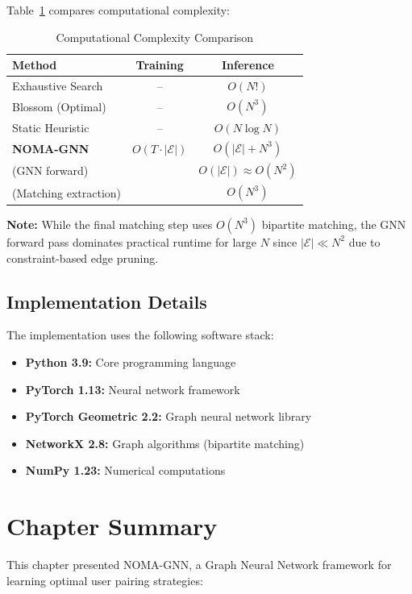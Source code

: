 Table~\ref{tab:complexity} compares computational complexity:

\begin{table}[ht]
\centering
\caption{Computational Complexity Comparison}
\label{tab:complexity}
\begin{tabular}{|l|c|c|}
\hline
\textbf{Method} & \textbf{Training} & \textbf{Inference} \\
\hline
Exhaustive Search & -- & $O(N!)$ \\
Blossom (Optimal) & -- & $O(N^3)$ \\
Static Heuristic & -- & $O(N \log N)$ \\
\hline
\textbf{NOMA-GNN} & $O(T \cdot |\mathcal{E}|)$ & $O(|\mathcal{E}| + N^3)$ \\
\quad (GNN forward) & & $O(|\mathcal{E}|) \approx O(N^2)$ \\
\quad (Matching extraction) & & $O(N^3)$ \\
\hline
\end{tabular}
\end{table}

\textbf{Note:} While the final matching step uses $O(N^3)$ bipartite matching, the GNN forward pass dominates practical runtime for large $N$ since $|\mathcal{E}| \ll N^2$ due to constraint-based edge pruning.

\subsection{Implementation Details}

The implementation uses the following software stack:

\begin{itemize}
    \item \textbf{Python 3.9:} Core programming language
    \item \textbf{PyTorch 1.13:} Neural network framework
    \item \textbf{PyTorch Geometric 2.2:} Graph neural network library
    \item \textbf{NetworkX 2.8:} Graph algorithms (bipartite matching)
    \item \textbf{NumPy 1.23:} Numerical computations
\end{itemize}

\section{Chapter Summary}

This chapter presented NOMA-GNN, a Graph Neural Network framework for learning optimal user pairing strategies:

